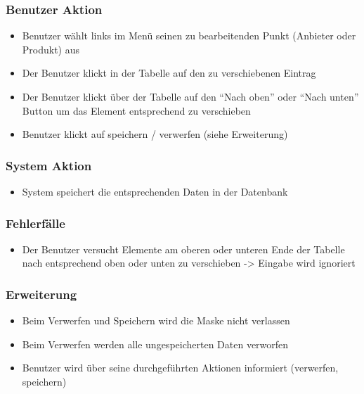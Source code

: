 \documentclass[a4paper,12pt]{article}
\begin{document}
\subsubsection{Benutzer Aktion}\label{benutzer-aktion-9}

\begin{itemize}

\item
  Benutzer wählt links im Menü seinen zu bearbeitenden Punkt (Anbieter
  oder Produkt) aus
\item
  Der Benutzer klickt in der Tabelle auf den zu verschiebenen Eintrag
\item
  Der Benutzer klickt über der Tabelle auf den ``Nach oben'' oder ``Nach
  unten'' Button um das Element entsprechend zu verschieben
\item
  Benutzer klickt auf speichern / verwerfen (siehe Erweiterung)
\end{itemize}

\subsubsection{System Aktion}\label{system-aktion-9}

\begin{itemize}

\item
  System speichert die entsprechenden Daten in der Datenbank
\end{itemize}

\subsubsection{Fehlerfälle}\label{fehlerfalle-9}

\begin{itemize}

\item
  Der Benutzer versucht Elemente am oberen oder unteren Ende der Tabelle
  nach entsprechend oben oder unten zu verschieben -\textgreater{}
  Eingabe wird ignoriert
\end{itemize}

\subsubsection{Erweiterung}\label{erweiterung-9}

\begin{itemize}

\item
  Beim Verwerfen und Speichern wird die Maske nicht verlassen
\item
  Beim Verwerfen werden alle ungespeicherten Daten verworfen
\item
  Benutzer wird über seine durchgeführten Aktionen informiert
  (verwerfen, speichern)
\end{itemize}
\end{document}
